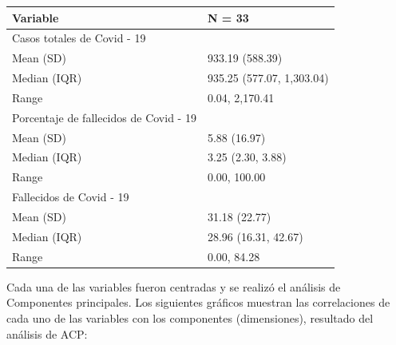 \begin{table}
\centering\begingroup\fontsize{7}{9}\selectfont

\begin{tabular}{ll}
\toprule
Variable & N = 33\\
\midrule
Casos totales de Covid - 19 & \\
\hspace{1em}Mean (SD) & 933.19 (588.39)\\
\hspace{1em}Median (IQR) & 935.25 (577.07, 1,303.04)\\
\hspace{1em}Range & 0.04, 2,170.41\\
Porcentaje de fallecidos de Covid - 19 & \\
\addlinespace
\hspace{1em}Mean (SD) & 5.88 (16.97)\\
\hspace{1em}Median (IQR) & 3.25 (2.30, 3.88)\\
\hspace{1em}Range & 0.00, 100.00\\
Fallecidos de Covid - 19 & \\
\hspace{1em}Mean (SD) & 31.18 (22.77)\\
\addlinespace
\hspace{1em}Median (IQR) & 28.96 (16.31, 42.67)\\
\hspace{1em}Range & 0.00, 84.28\\
\bottomrule
\end{tabular}
\endgroup{}
\end{table}

Cada una de las variables fueron centradas y se realizó el análisis de
Componentes principales. Los siguientes gráficos muestran las
correlaciones de cada uno de las variables con los componentes
(dimensiones), resultado del análisis de ACP:

